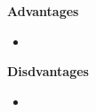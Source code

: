 \vskip 0.5cm
\noindent
\textbf{Advantages}
\begin{itemize}
\item

\end{itemize}

\vskip 0.5cm
\noindent
\textbf{Disdvantages}
\begin{itemize}
\item

\end{itemize}

